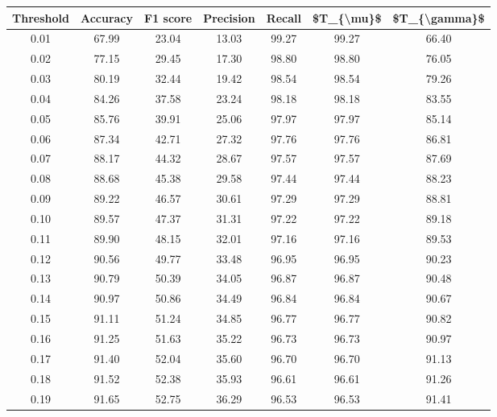 \begin{tabular}{|c|c|c|c|c|c|c|}
\toprule
 Threshold &  Accuracy &  F1 score &  Precision &  Recall &  \$T\_\{\textbackslash mu\}\$ &  \$T\_\{\textbackslash gamma\}\$ \\
\hline
      0.01 &     67.99 &     23.04 &      13.03 &   99.27 &      99.27 &         66.40 \\
      0.02 &     77.15 &     29.45 &      17.30 &   98.80 &      98.80 &         76.05 \\
      0.03 &     80.19 &     32.44 &      19.42 &   98.54 &      98.54 &         79.26 \\
      0.04 &     84.26 &     37.58 &      23.24 &   98.18 &      98.18 &         83.55 \\
      0.05 &     85.76 &     39.91 &      25.06 &   97.97 &      97.97 &         85.14 \\
      0.06 &     87.34 &     42.71 &      27.32 &   97.76 &      97.76 &         86.81 \\
      0.07 &     88.17 &     44.32 &      28.67 &   97.57 &      97.57 &         87.69 \\
      0.08 &     88.68 &     45.38 &      29.58 &   97.44 &      97.44 &         88.23 \\
      0.09 &     89.22 &     46.57 &      30.61 &   97.29 &      97.29 &         88.81 \\
      0.10 &     89.57 &     47.37 &      31.31 &   97.22 &      97.22 &         89.18 \\
      0.11 &     89.90 &     48.15 &      32.01 &   97.16 &      97.16 &         89.53 \\
      0.12 &     90.56 &     49.77 &      33.48 &   96.95 &      96.95 &         90.23 \\
      0.13 &     90.79 &     50.39 &      34.05 &   96.87 &      96.87 &         90.48 \\
      0.14 &     90.97 &     50.86 &      34.49 &   96.84 &      96.84 &         90.67 \\
      0.15 &     91.11 &     51.24 &      34.85 &   96.77 &      96.77 &         90.82 \\
      0.16 &     91.25 &     51.63 &      35.22 &   96.73 &      96.73 &         90.97 \\
      0.17 &     91.40 &     52.04 &      35.60 &   96.70 &      96.70 &         91.13 \\
      0.18 &     91.52 &     52.38 &      35.93 &   96.61 &      96.61 &         91.26 \\
      0.19 &     91.65 &     52.75 &      36.29 &   96.53 &      96.53 &         91.41 \\

\end{tabular}
